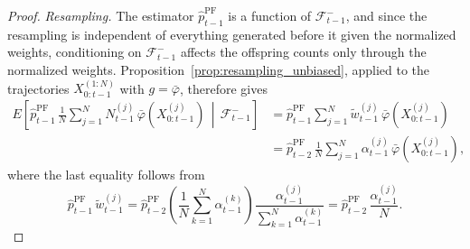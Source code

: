 \begin{proof}
    \emph{Resampling.} The estimator $\hat{p}^{\mathrm{PF}}_{t-1}$ is a function of $\mathcal{F}_{t-1}^{-}$, and since the resampling is independent of everything generated before it given the normalized weights, conditioning on $\mathcal{F}_{t-1}^{-}$ affects the offspring counts only through the normalized weights. Proposition~\ref{prop:resampling_unbiased}, applied to the trajectories $X_{0:t-1}^{(1:N)}$ with $g = \bar{\varphi}$, therefore gives
    \begin{align}
        E\left[\hat{p}^{\mathrm{PF}}_{t-1}\,\frac{1}{N}\sum_{j=1}^{N}N_{t-1}^{(j)}\,\bar{\varphi}(X_{0:t-1}^{(j)}) \,\middle|\, \mathcal{F}_{t-1}^{-}\right] &= \hat{p}^{\mathrm{PF}}_{t-1}\sum_{j=1}^{N} \tilde{w}_{t-1}^{(j)}\,\bar{\varphi}(X_{0:t-1}^{(j)}) \\
        &= \hat{p}^{\mathrm{PF}}_{t-2}\,\frac{1}{N}\sum_{j=1}^{N} \alpha_{t-1}^{(j)}\,\bar{\varphi}(X_{0:t-1}^{(j)}),
        \label{eq:pf_resampling_step}
    \end{align}
    where the last equality follows from
    \begin{equation}
        \hat{p}^{\mathrm{PF}}_{t-1}\,\tilde{w}_{t-1}^{(j)} = \hat{p}^{\mathrm{PF}}_{t-2}\left(\frac{1}{N}\sum_{k=1}^{N}\alpha_{t-1}^{(k)}\right)\frac{\alpha_{t-1}^{(j)}}{\sum_{k=1}^{N}\alpha_{t-1}^{(k)}} = \hat{p}^{\mathrm{PF}}_{t-2}\,\frac{\alpha_{t-1}^{(j)}}{N}.
        \label{eq:pf_weight_identity}
    \end{equation}


\end{proof}
